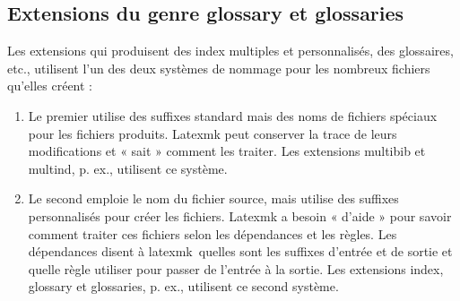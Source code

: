 \documentclass[11pt,french]{article}
\newcommand{\TS}{\textsf{\TeX Shop}}
\newcommand{\latexmk}{\textsf{latexmk}}
\newcommand{\cmd}[1]{\textsf{#1}}
\begin{document}
%
%


\subsection{Extensions du genre \cmd{glossary} et \cmd{glossaries}}

Les extensions qui produisent des index multiples et personnalisés, des glossaires, etc., utilisent l'un des deux systèmes de nommage pour les nombreux fichiers qu'elles créent :
\begin{enumerate}
\item 
Le premier utilise des suffixes standard mais des noms de fichiers spéciaux pour les fichiers produits. \cmd{Latexmk} peut conserver la trace de leurs modifications et « sait » comment les traiter. Les extensions \cmd{multibib} et \cmd{multind}, p. ex., utilisent ce système.
\item 
Le second emploie le nom du fichier source, mais utilise des suffixes personnalisés pour créer les fichiers. \cmd{Latexmk} a besoin « d'aide » pour savoir comment traiter ces fichiers selon les dépendances et les règles. Les dépendances disent à \latexmk\ quelles sont les suffixes d'entrée et de sortie et quelle règle utiliser pour passer de l'entrée à la sortie. Les extensions \cmd{index}, \cmd{glossary} et \cmd{glossaries}, p. ex., utilisent ce second système.
\end{enumerate}
\end{document}
